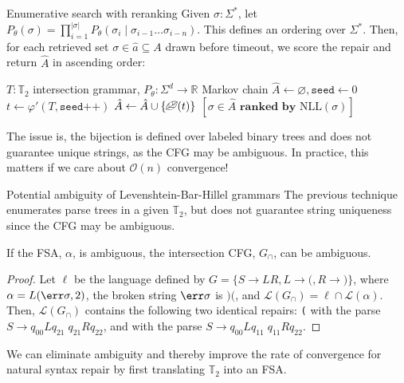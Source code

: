 \documentclass{beamer}
\begin{document}
\begin{frame}[fragile]{Enumerative search with reranking}
Given $\sigma: \Sigma^*$, let $P_\theta(\sigma) = \prod_{i=1}^{|\sigma|}P_\theta(\sigma_i \mid \sigma_{i-1}\ldots\sigma_{i-n})$. This defines an ordering over $\Sigma^*$. Then, for each retrieved set $\sigma \in \hat{a} \subseteq A$ drawn before timeout, we score the repair and return $\hat{A}$ in ascending order:

\begin{algorithm}[H]
\caption{Enumerative tree sampling with n-gram reranking}
\label{alg:enum_ngram}
\begin{algorithmic}[1]
\Require $T: \mathbb{T}_2$ intersection grammar, $P_\theta: \Sigma^d \rightarrow \mathbb{R}$ Markov chain
\State $\hat{A} \gets \varnothing, \texttt{seed} \gets 0$ 
\State $t \gets \varphi'(T, \texttt{seed++})$ 
\State $\hat{A} \gets \hat{A} \cup \{\text{\textleaf}(t)\}$
\EndFor
\State \Return $[\sigma \in \hat{A} \textbf{ ranked by } \text{NLL}(\sigma)]$ 
\end{algorithmic}
\end{algorithm}

The issue is, the bijection is defined over labeled binary trees and does not guarantee unique strings, as the CFG may be ambiguous. In practice, this matters if we care about $\mathcal{O}(n)$ convergence!
\end{frame}

\begin{frame}[fragile]{Potential ambiguity of Levenshtein-Bar-Hillel grammars}
The previous technique enumerates parse trees in a given $\mathbb{T}_2$, but does not guarantee string uniqueness since the CFG may be ambiguous.

\begin{lemma}\label{lemma:ambiguity}
If the FSA, $\alpha$, is ambiguous, the intersection CFG, $G_\cap$, can be ambiguous.
\end{lemma}

\begin{proof}
Let $\ell$ be the language defined by $G=\{S\rightarrow LR, L \rightarrow\texttt{(}, R \rightarrow\texttt{)}\}$, where $\alpha=L(\err\sigma, 2)$, the broken string $\err\sigma$ is $\texttt{)(}$, and $\mathcal{L}(G_\cap) = \ell \cap \mathcal{L}(\alpha)$. Then, $\mathcal{L}(G_\cap)$ contains the following two identical repairs: \texttt{\hlred{)}(\hlgreen{)}} with the parse $S \rightarrow q_{00}Lq_{21}\phantom{.}q_{21}Rq_{22}$, and \texttt{\hlorange{(}\hlorange{)}} with the parse $S \rightarrow q_{00}Lq_{11}\phantom{.}q_{11}Rq_{22}$.
\end{proof}

We can eliminate ambiguity and thereby improve the rate of convergence for natural syntax repair by first translating $\mathbb{T}_2$ into an FSA.
\end{frame}
\end{document}
